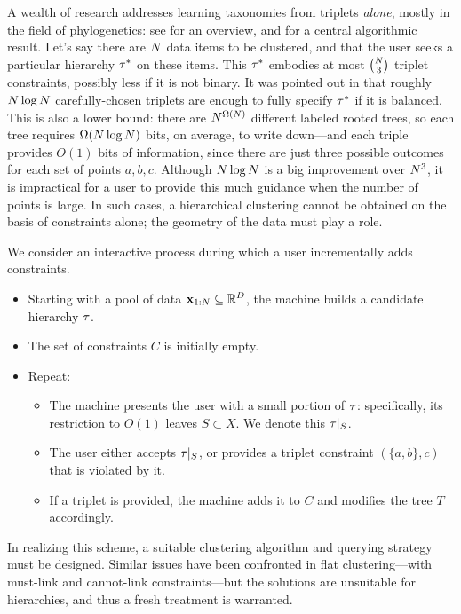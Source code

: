 A wealth of research addresses learning taxonomies from triplets {\it alone}, mostly in the field of phylogenetics: see \citet{Felsenstein2004} for an overview, and \citet{Aho1981} for a central algorithmic result. Let's say there are $N$ data items to be clustered, and that the user seeks a particular hierarchy $\tau^*$ on these items. This $\tau^*$ embodies at most ${N \choose 3}$ triplet constraints, possibly less if it is not binary. It was pointed out in \citet{Tamuz2011} that roughly $N \log N$ carefully-chosen triplets are enough to fully specify $\tau^*$ if it is balanced. This is also a lower bound: there are $N^{\Omega(N)}$ different labeled rooted trees, so each tree requires $\Omega(N \log N)$ bits, on average, to write down---and each triple provides $O(1)$ bits of information, since there are just three possible outcomes for each set of points $a,b,c$. Although $N \log N$ is a big improvement over $N^3$, it is impractical for a user to provide this much guidance when the number of points is large. In such cases, a hierarchical clustering cannot be obtained on the basis of constraints alone; the geometry of the data must play a role.

We consider an interactive process during which a user incrementally adds constraints.
\begin{itemize}
\item Starting with a pool of data $\mathbf{x}_{1:N} \subseteq \mathbb{R}^D$, the machine builds a candidate hierarchy $\tau$.
\item The set of constraints $C$ is initially empty.
\item Repeat:
\begin{itemize}
\item The machine presents the user with a small portion of $\tau$: specifically, its restriction to $O(1)$ leaves $S \subset X$. We denote this $\tau|_S$.
\item The user either accepts $\tau|_S$, or provides a triplet constraint $(\{a,b\},c)$ that is violated by it.
\item If a triplet is provided, the machine adds it to $C$ and modifies the tree $T$ accordingly.
\end{itemize}
\end{itemize}
In realizing this scheme, a suitable clustering algorithm and querying strategy must be designed. Similar issues have been confronted in flat clustering---with must-link and cannot-link constraints---but the solutions are unsuitable for hierarchies, and thus a fresh treatment is warranted.

